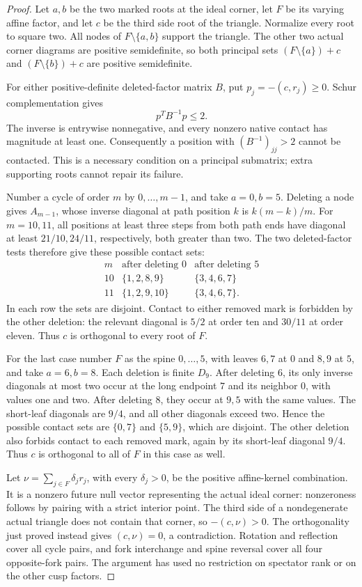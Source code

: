 \begin{proof}
Let $a,b$ be the two marked roots at the ideal corner, let $F$ be its
varying affine factor, and let $c$ be the third side root of the
triangle. Normalize every root to square two. All nodes of
$F\setminus\{a,b\}$ support the triangle. The other two actual
corner diagrams are positive semidefinite, so both principal sets
$(F\setminus\{a\})+c$ and $(F\setminus\{b\})+c$ are positive
semidefinite.

For either positive-definite deleted-factor matrix $B$, put
$p_j=-(c,r_j)\ge0$. Schur complementation gives
\[
 p^TB^{-1}p\le2.
\]
The inverse is entrywise nonnegative, and every nonzero native contact
has magnitude at least one. Consequently a position with
$(B^{-1})_{jj}>2$ cannot be contacted. This is a necessary condition
on a principal submatrix; extra supporting roots cannot repair its
failure.

Number a cycle of order $m$ by $0,\ldots,m-1$, and take $a=0,b=5$.
Deleting a node gives $A_{m-1}$, whose inverse diagonal at path
position $k$ is $k(m-k)/m$. For $m=10,11$, all positions at least
three steps from both path ends have diagonal at least
$21/10,24/11$, respectively, both greater than two. The two
deleted-factor tests therefore give these possible contact sets:
\[
\begin{array}{c|c|c}
 m&\text{after deleting }0&\text{after deleting }5\\\hline
 10&\{1,2,8,9\}&\{3,4,6,7\}\\
 11&\{1,2,9,10\}&\{3,4,6,7\}.
\end{array}
\]
In each row the sets are disjoint. Contact to either removed mark
is forbidden by the other deletion: the relevant diagonal is
$5/2$ at order ten and $30/11$ at order eleven. Thus $c$ is
orthogonal to every root of $F$.

For the last case number $F$ as the spine $0,\ldots,5$, with
leaves $6,7$ at $0$ and $8,9$ at $5$, and take $a=6,b=8$.
Each deletion is finite $D_9$. After deleting $6$, its only
inverse diagonals at most two occur at the long endpoint $7$
and its neighbor $0$, with values one and two. After deleting
$8$, they occur at $9,5$ with the same values. The short-leaf
diagonals are $9/4$, and all other diagonals exceed two.
Hence the possible contact sets are $\{0,7\}$ and $\{5,9\}$,
which are disjoint. The other deletion also forbids contact to
each removed mark, again by its short-leaf diagonal $9/4$.
Thus $c$ is orthogonal to all of $F$ in this case as well.

Let $\nu=\sum_{j\in F}\delta_jr_j$, with every $\delta_j>0$,
be the positive affine-kernel combination. It is a nonzero future
null vector representing the actual ideal corner: nonzeroness
follows by pairing with a strict interior point. The third side
of a nondegenerate actual triangle does not contain that corner,
so $-(c,\nu)>0$. The orthogonality just proved instead gives
$(c,\nu)=0$, a contradiction. Rotation and reflection cover all
cycle pairs, and fork interchange and spine reversal cover all
four opposite-fork pairs. The argument has used no restriction
on spectator rank or on the other cusp factors.
\end{proof}

